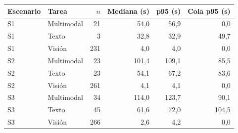 \begin{tabular}{llrrrr}
\hline
Escenario & Tarea & $n$ & Mediana (s) & p95 (s) & Cola p95 (s) \\
\hline
S1 & Multimodal & 21 & 54{,}0 & 56{,}9 & 0{,}0 \\
S1 & Texto & 3 & 32{,}8 & 32{,}9 & 49{,}7 \\
S1 & Visión & 231 & 4{,}0 & 4{,}0 & 0{,}0 \\
S2 & Multimodal & 23 & 101{,}4 & 109{,}1 & 85{,}5 \\
S2 & Texto & 23 & 54{,}1 & 67{,}2 & 83{,}6 \\
S2 & Visión & 261 & 4{,}1 & 4{,}1 & 0{,}0 \\
S3 & Multimodal & 34 & 114{,}0 & 123{,}7 & 90{,}1 \\
S3 & Texto & 45 & 61{,}6 & 72{,}0 & 104{,}5 \\
S3 & Visión & 266 & 2{,}6 & 4{,}2 & 0{,}0 \\
\hline
\end{tabular}
